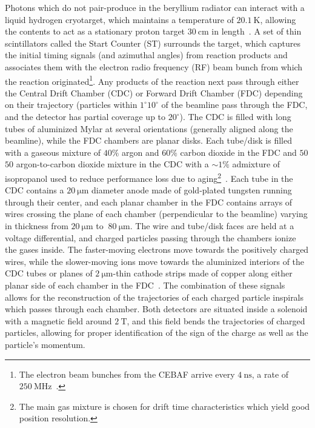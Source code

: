 Photons which do not pair-produce in the beryllium radiator can interact with a liquid hydrogen cryotarget, which maintains a temperature of $\SI{20.1}{\K}$, allowing the contents to act as a stationary proton target $\SI{30}{\centi\meter}$ in length~\cite{Adhikari2021}. A set of thin scintillators called the Start Counter (ST) surrounds the target, which captures the initial timing signals (and azimuthal angles) from reaction products and associates them with the electron radio frequency (RF) beam bunch from which the reaction originated\footnote{The electron beam bunches from the CEBAF arrive every $\SI{4}{\nano\s}$, a rate of $\SI{250}{\mega\hertz}$~\cite{Adhikari2021}.}. Any products of the reaction next pass through either the Central Drift Chamber (CDC) or Forward Drift Chamber (FDC) depending on their trajectory (particles within $1^{\circ}$\textendash$10^{\circ}$ of the beamline pass through the FDC, and the detector has partial coverage up to $20^{\circ}$). The CDC is filled with long tubes of aluminized Mylar at several orientations (generally aligned along the beamline), while the FDC chambers are planar disks. Each tube/disk is filled with a gaseous mixture of $40\%$ argon and $60\%$ carbon dioxide in the FDC and $50$\textemdash$50$ argon-to-carbon dioxide mixture in the CDC with a $\sim 1\%$ admixture of isopropanol used to reduce performance loss due to aging\footnote{The main gas mixture is chosen for drift time characteristics which yield good position resolution.}~\cite{Adhikari2021}. Each tube in the CDC contains a $\SI{20}{\micro\meter}$ diameter anode made of gold-plated tungsten running through their center, and each planar chamber in the FDC contains arrays of wires crossing the plane of each chamber (perpendicular to the beamline) varying in thickness from $\SI{20}{\micro\meter}$ to $~\SI{80}{\micro\meter}$. The wire and tube/disk faces are held at a voltage differential, and charged particles passing through the chambers ionize the gases inside. The faster-moving electrons move towards the positively charged wires, while the slower-moving ions move towards the aluminized interiors of the CDC tubes or planes of $\SI{2}{\micro\meter}$-thin cathode strips made of copper along either planar side of each chamber in the FDC~\cite{Adhikari2021}. The combination of these signals allows for the reconstruction of the trajectories of each charged particle inspirals which passes through each chamber. Both detectors are situated inside a solenoid with a magnetic field around $\SI{2}{\tesla}$, and this field bends the trajectories of charged particles, allowing for proper identification of the sign of the charge as well as the particle's momentum.

